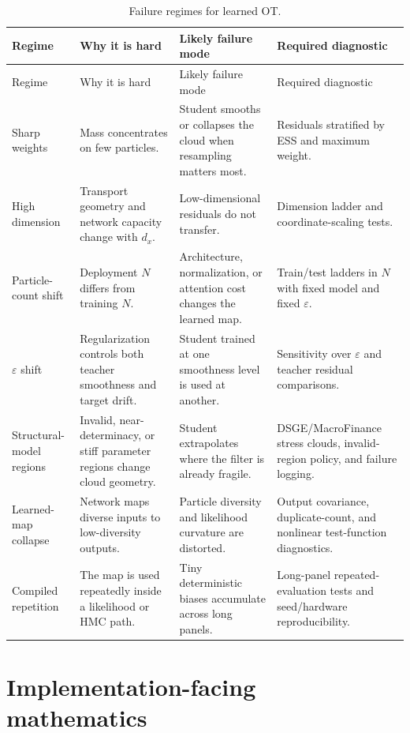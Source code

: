 \begin{longtable}{@{}p{} p{} p{} p{}@{}}
\caption{Failure regimes for learned OT.}
\label{tab:bf-learned-ot-failure-regimes}\\
\toprule
Regime & Why it is hard & Likely failure mode & Required diagnostic \\
\midrule
\endfirsthead
\toprule
Regime & Why it is hard & Likely failure mode & Required diagnostic \\
\midrule
\endhead
Sharp weights &
Mass concentrates on few particles. &
Student smooths or collapses the cloud when resampling matters most. &
Residuals stratified by ESS and maximum weight. \\
High dimension &
Transport geometry and network capacity change with $d_x$. &
Low-dimensional residuals do not transfer. &
Dimension ladder and coordinate-scaling tests. \\
Particle-count shift &
Deployment $N$ differs from training $N$. &
Architecture, normalization, or attention cost changes the learned map. &
Train/test ladders in $N$ with fixed model and fixed $\varepsilon$. \\
$\varepsilon$ shift &
Regularization controls both teacher smoothness and target drift. &
Student trained at one smoothness level is used at another. &
Sensitivity over $\varepsilon$ and teacher residual comparisons. \\
Structural-model regions &
Invalid, near-determinacy, or stiff parameter regions change cloud geometry. &
Student extrapolates where the filter is already fragile. &
DSGE/MacroFinance stress clouds, invalid-region policy, and failure logging. \\
Learned-map collapse &
Network maps diverse inputs to low-diversity outputs. &
Particle diversity and likelihood curvature are distorted. &
Output covariance, duplicate-count, and nonlinear test-function diagnostics. \\
Compiled repetition &
The map is used repeatedly inside a likelihood or HMC path. &
Tiny deterministic biases accumulate across long panels. &
Long-panel repeated-evaluation tests and seed/hardware reproducibility. \\
\bottomrule
\end{longtable}

\section{Implementation-facing mathematics}
\label{sec:bf-learned-ot-implementation-math}

